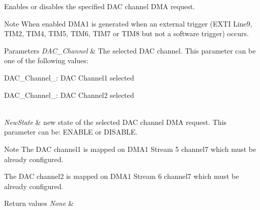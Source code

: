 Enables or disables the specified D\+A\+C channel D\+M\+A request. 

\begin{DoxyNote}{Note}
When enabled D\+M\+A1 is generated when an external trigger (E\+X\+T\+I Line9, T\+I\+M2, T\+I\+M4, T\+I\+M5, T\+I\+M6, T\+I\+M7 or T\+I\+M8 but not a software trigger) occurs. 
\end{DoxyNote}

\begin{DoxyParams}{Parameters}
{\em D\+A\+C\+\_\+\+Channel} & The selected D\+A\+C channel. This parameter can be one of the following values\+: \begin{DoxyItemize}
\item D\+A\+C\+\_\+\+Channel\+\_\+: D\+A\+C Channel1 selected \item D\+A\+C\+\_\+\+Channel\+\_\+: D\+A\+C Channel2 selected \end{DoxyItemize}
\\
\hline
{\em New\+State} & new state of the selected D\+A\+C channel D\+M\+A request. This parameter can be\+: E\+N\+A\+B\+L\+E or D\+I\+S\+A\+B\+L\+E. \\
\hline
\end{DoxyParams}
\begin{DoxyNote}{Note}
The D\+A\+C channel1 is mapped on D\+M\+A1 Stream 5 channel7 which must be already configured. 

The D\+A\+C channel2 is mapped on D\+M\+A1 Stream 6 channel7 which must be already configured. 
\end{DoxyNote}

\begin{DoxyRetVals}{Return values}
{\em None} & \\
\hline
\end{DoxyRetVals}
